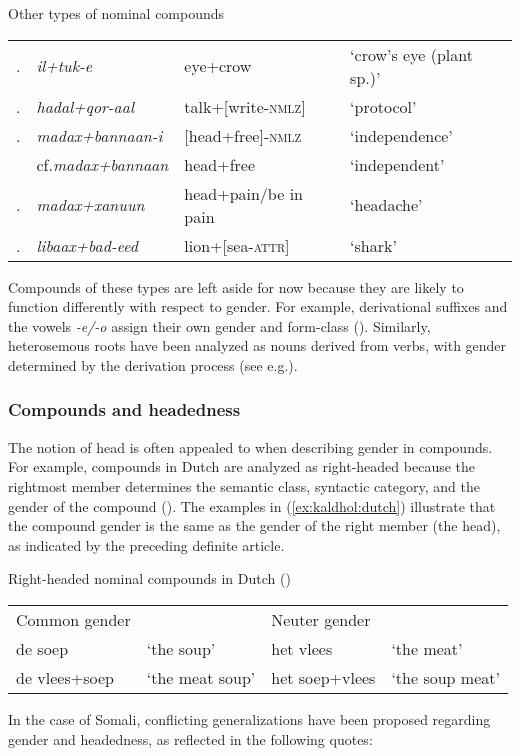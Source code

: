 \documentclass[output=paper]{langscibook}
\begin{document}
\ea\label{ex:kaldhol:othercomps}
	Other types of nominal compounds\\
	\begin{tabular}{@{}ll@{ }l@{ }l@{}}
		\myletter\label{ex:kaldhol:iltuke}. & \textit{il+tuk-e} & eye+crow & `crow's eye (plant sp.)'\\
		\myletter\label{ex:kaldhol:protocol}. & \textit{hadal+qor-aal} & talk+[write-\textsc{nmlz}] & `protocol'\\
		\myletter\label{ex:kaldhol:independence}. & \textit{madax+bannaan-i} & [head+free]-\textsc{nmlz}            & `independence'\\
		& cf.\@ \textit{madax+bannaan} & head+free & `independent'\\
		\myletter\label{ex:kaldhol:headache}. & \textit{madax+xanuun} & head+pain/be in pain & `headache'\\
		\myletter\label{ex:kaldhol:shark}. & \textit{libaax+bad-eed} & lion+[sea-\textsc{attr}] &`shark'
	\end{tabular}\setcounter{mycounter}{0}
\z
Compounds of these types are left aside for now because they are likely to function differently with respect to gender. For example, derivational suffixes and the vowels \textit{-e/-o} assign their own gender and form-class (\citealt{Saeed1999a}). Similarly, heterosemous roots have been analyzed as nouns derived from verbs, with gender determined by the derivation process (see e.g.\@ \citealt[149]{Saeed1999a}). 

\subsubsection{Compounds and headedness}\label{sec:kaldhol:heads}
The notion of head is often appealed to when describing gender in compounds. For example, compounds in Dutch are analyzed as right-headed because the rightmost member determines the semantic class, syntactic category, and the gender of the compound (\citealt[141--142]{Booij2002}). The examples in (\ref{ex:kaldhol:dutch}) illustrate that the compound gender is the same as the gender of the right member (the head), as indicated by the preceding definite article.

\ea\label{ex:kaldhol:dutch}
	Right-headed nominal compounds in Dutch (\citealt[142]{Booij2002})\\	
	\begin{tabular}{llll}
		Common gender                 && Neuter gender &                 \\
		de soep &`the soup'            & het vlees &`the meat'           \\
		de vlees+soep &`the meat soup' & het soep+vlees &`the soup meat'
	\end{tabular}
\z
In the case of Somali, conflicting generalizations have been proposed regarding gender and headedness, as reflected in the following quotes:
\end{document}

